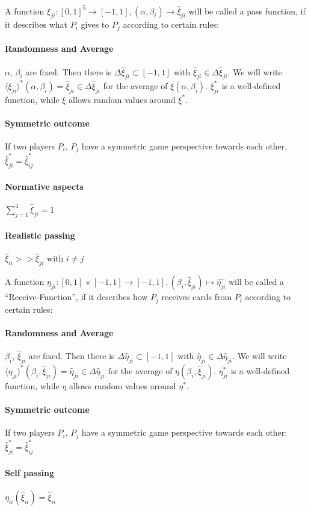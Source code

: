 \begin{definition}
A function $\xi_{ji} : [0,1]^5 \to [-1,1], (\alpha, \beta_i) \to \hat{\xi}_{ji}$ will be called a pass function, if it describes what $P_i$ gives to $P_j$ according to certain rules:
\paragraph{Randomness and Average}
$\alpha$, $\beta_i$ are fixed. Then there is $\Delta  \hat{\xi}_{ji} \subset [-1,1]$ with  $\hat{\xi}_{ji} \in \Delta  \hat{\xi}_{ji}$. We will write $\langle\xi_{ji}\rangle^* (\alpha, \beta_i) =  \hat{\xi}_{ji} \in \Delta  \hat{\xi}_{ji}$ for the average of $\xi(\alpha, \beta_i)$. $\xi_{ji}^*$ is a well-defined function, while $\xi$ allows random values around $\xi^*$.
\paragraph{Symmetric outcome}
If two players $P_i$, $P_j$ have a symmetric game perspective towards each other,  $\hat{\xi}_{ji}^* =  \hat{\xi}_{ij}^*$
\paragraph{Normative aspects}
$\sum_{j = 1}^4 \hat{\xi}_{ji} = 1$
\paragraph{Realistic passing}
$\hat{\xi}_{ii} >>  \hat{\xi}_{ji}$ with $ i \neq j $
\end{definition}
\begin{definition}
A function $\eta_{ji}: [0,1] \times [-1,1] \to [-1,1], (\beta_i,  \hat{\xi}_{ji}) \mapsto \hat{\eta_{ji}}$ will be
called a “Receive-Function”, if it describes how $P_j$ receives cards from $P_i$ according to certain rules:
\paragraph{Randomness and Average}
$\beta_i$, $\hat{\xi}_{ji}$ are fixed. Then there is $\Delta  \hat{\eta}_{ji} \subset [-1,1]$ with  $\hat{\eta}_{ji} \in \Delta  \hat{\eta}_{ji}$. We will write $\langle\eta_{ji}\rangle^* (\beta_i, \hat{\xi}_{ji}) =  \hat{\eta}_{ji} \in \Delta  \hat{\eta}_{ji}$ for the average of $\eta(\beta_i, \hat{\xi}_{ji})$. $\eta_{ji}^*$ is a well-defined function, while $\eta$ allows random values around $\eta^*$.
\paragraph{Symmetric outcome}
If two players $P_i$, $P_j$ have a symmetric game perspective towards each other:  $\hat{\xi}_{ji}^* =  \hat{\xi}_{ij}^*$
\paragraph{Self passing}
$\eta_{ii}(\hat{\xi}_{ii}) = \hat{\xi}_{ii} $
\end{definition}
